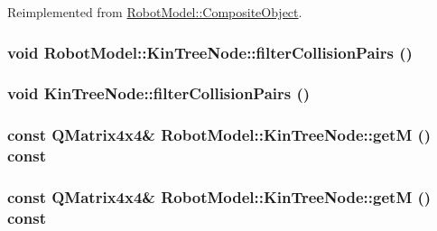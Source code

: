 Reimplemented from \hyperlink{class_robot_model_1_1_composite_object_ad33452f1246939d366ffbf02d1022a91}{RobotModel::CompositeObject}.\hypertarget{class_robot_model_1_1_kin_tree_node_a560df50c25717025df7a4682968b7319}{
\subsubsection[{filterCollisionPairs}]{\setlength{\rightskip}{0pt plus 5cm}void RobotModel::KinTreeNode::filterCollisionPairs ()}}
\label{class_robot_model_1_1_kin_tree_node_a560df50c25717025df7a4682968b7319}
\hypertarget{class_robot_model_1_1_kin_tree_node_a51113339b5ffc471c058218f1294d73a}{
\subsubsection[{filterCollisionPairs}]{\setlength{\rightskip}{0pt plus 5cm}void KinTreeNode::filterCollisionPairs ()}}
\label{class_robot_model_1_1_kin_tree_node_a51113339b5ffc471c058218f1294d73a}
\hypertarget{class_robot_model_1_1_kin_tree_node_a5c91c678cc74412ec298e61a39b47e3e}{
\subsubsection[{getM}]{\setlength{\rightskip}{0pt plus 5cm}const QMatrix4x4\& RobotModel::KinTreeNode::getM () const}}
\label{class_robot_model_1_1_kin_tree_node_a5c91c678cc74412ec298e61a39b47e3e}
\hypertarget{class_robot_model_1_1_kin_tree_node_a5c91c678cc74412ec298e61a39b47e3e}{
\subsubsection[{getM}]{\setlength{\rightskip}{0pt plus 5cm}const QMatrix4x4\& RobotModel::KinTreeNode::getM () const}}
